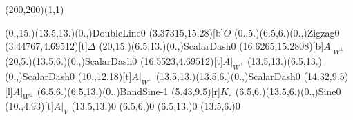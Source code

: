 \unitlength=1bp%

\begin{feynartspicture}(200,200)(1,1)

\FADiagram{}
\FAProp(0.,15.)(13.5,13.)(0.,){DoubleLine}{0}
\FALabel(3.37315,15.28)[b]{$O$}
\FAProp(0.,5.)(6.5,6.)(0.,){Zigzag}{0}
\FALabel(3.44767,4.69512)[t]{$\Delta$}
\FAProp(20,15.)(6.5,13.)(0.,){ScalarDash}{0}
\FALabel(16.6265,15.2808)[b]{$A|_{W^\perp}$}
\FAProp(20,5.)(13.5,6.)(0.,){ScalarDash}{0}
\FALabel(16.5523,4.69512)[t]{$A|_{W^\perp}$}
\FAProp(13.5,13.)(6.5,13.)(0.,){ScalarDash}{0}
\FALabel(10.,12.18)[t]{$A|_{W^\perp}$}
\FAProp(13.5,13.)(13.5,6.)(0.,){ScalarDash}{0}
\FALabel(14.32,9.5)[l]{$A|_{W^\perp}$}
\FAProp(6.5,6.)(6.5,13.)(0.,){BandSine}{-1}
\FALabel(5.43,9.5)[r]{$K_\varepsilon$}
\FAProp(6.5,6.)(13.5,6.)(0.,){Sine}{0}
\FALabel(10.,4.93)[t]{$A|_V$}
\FAVert(13.5,13.){0}
\FAVert(6.5,6.){0}
\FAVert(6.5,13.){0}
\FAVert(13.5,6.){0}
\end{feynartspicture}

